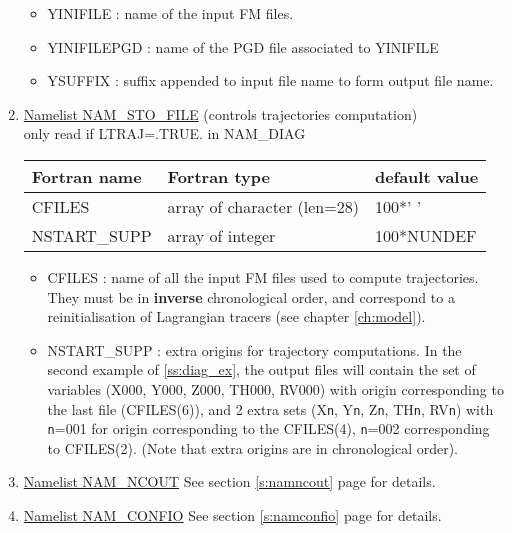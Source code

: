 \begin{enumerate}
\begin{itemize}
\item YINIFILE : name of the input FM files.
\item YINIFILEPGD : name of the PGD file associated to YINIFILE

\item YSUFFIX : suffix appended to input file name to form output file name.
\end{itemize}

\item\underline{Namelist NAM\_STO\_FILE} (controls trajectories computation) \\
only read if LTRAJ=.TRUE. in NAM\_DIAG
\begin{center}
\begin{tabular} {|l|l|l|}
\hline
Fortran name & Fortran type & default value\\
\hline
CFILES        & array of character (len=28)  & 100*' '   \\
NSTART\_SUPP  & array of integer  & 100*NUNDEF   \\
\hline
\end{tabular}
\end{center}

\begin{itemize}
\item CFILES : name of all the input FM files used to compute 
trajectories. They must be in {\bf inverse} chronological order, and correspond
to a reinitialisation of Lagrangian tracers (see chapter \ref{ch:model}).
\item NSTART\_SUPP : extra origins for trajectory computations. In the second 
example of \ref{ss:diag_ex}, the output files will contain the set of variables
(X000, Y000, Z000, TH000, RV000) with origin corresponding to the last file
(CFILES(6)), and 2 extra sets (X{\tt n}, Y{\tt n}, Z{\tt n}, TH{\tt n}, 
RV{\tt n}) with {\tt n}=001 for origin corresponding to the CFILES(4),
{\tt n}=002 corresponding to CFILES(2). (Note that extra origins are in
chronological order).

\end{itemize}
\item\underline{Namelist NAM\_NCOUT}
See section \ref{s:namncout} page \pageref{s:namncout} for details.

\item\underline{Namelist NAM\_CONFIO}
See section \ref{s:namconfio} page \pageref{s:namconfio} for details.


\end{enumerate}
